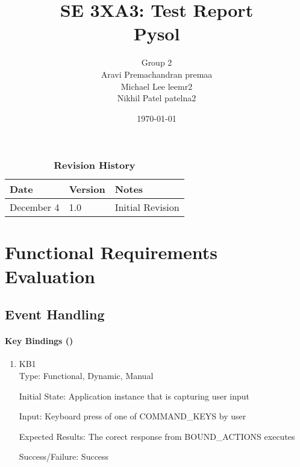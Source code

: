 \documentclass[12pt, titlepage]{article}
\title{SE 3XA3: Test Report\\Pysol}
\author{Group 2
		\\ Aravi Premachandran premaa
		\\ Michael Lee  leemr2
		\\ Nikhil Patel  patelna2
}
\date{\today}
\begin{document}
\maketitle

\tableofcontents
\listoftables
\listoffigures

\begin{table}[bp]
\caption{\bf Revision History}
\begin{tabularx}{\textwidth}{p{3cm}p{2cm}X}
\toprule {\bf Date} & {\bf Version} & {\bf Notes}\\
\midrule
December 4 & 1.0 & Initial Revision\\
\bottomrule
\end{tabularx}
\end{table}

\newpage



\section{Functional Requirements Evaluation}

	\subsection{Event Handling}
	
	\paragraph{Key Bindings ()}
	\begin{enumerate}
		\item{KB1\\}
		Type: Functional, Dynamic, Manual
		
		Initial State: Application instance that is capturing user input
		
		Input: Keyboard press of one of COMMAND\_KEYS by user
		
		Expected Results: The corect response from BOUND_ACTIONS executes 

		Success/Failure: Success
		
	\end{enumerate}
\end{document}
